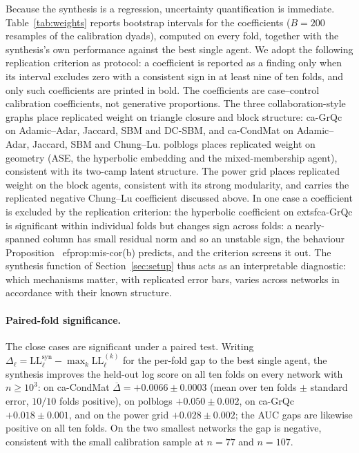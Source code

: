 \documentclass[12pt]{article}
\newcommand{\1}{\mathbf{1}}
\begin{document}
Because the synthesis is a regression, uncertainty quantification is immediate.
Table~\ref{tab:weights} reports bootstrap intervals for the coefficients ($B=200$ resamples of the
calibration dyads), computed on every fold, together with the synthesis's own performance against
the best single agent. We adopt the following replication criterion as protocol: a coefficient is
reported as a finding only when its interval excludes zero with a consistent sign in at least nine
of ten folds, and only such coefficients are printed in bold. The coefficients are case--control calibration coefficients, not generative proportions. The three collaboration-style graphs place replicated weight on triangle closure and block structure: \textsf{ca-GrQc} on
Adamic--Adar, Jaccard, SBM and DC-SBM, and \textsf{ca-CondMat} on Adamic--Adar, Jaccard, SBM and
Chung--Lu. \textsf{polblogs} places replicated weight on geometry (ASE, the hyperbolic embedding and the
mixed-membership agent), consistent with its two-camp latent structure. The \textsf{power} grid
places replicated weight on the block agents, consistent with its strong modularity, and carries the replicated
negative Chung--Lu coefficient discussed above. In one case a coefficient is excluded by the replication criterion: the hyperbolic coefficient on 	extsf{ca-GrQc} is significant within individual folds but changes sign across folds: a nearly-spanned column has small residual norm and so an unstable sign, the behaviour Proposition~
ef{prop:mis-cor}(b) predicts, and the criterion screens it out.
The synthesis function of Section~\ref{sec:setup} thus acts as an interpretable diagnostic: which
mechanisms matter, with replicated error bars, varies across networks in accordance with their known
structure.

\paragraph{Paired-fold significance.}
The close cases are significant under a paired test. Writing $\Delta_\ell=\mathrm{LL}^{\mathrm{syn}}
_\ell-\max_k\mathrm{LL}^{(k)}_\ell$ for the per-fold gap to the best single agent, the synthesis
improves the held-out log score on all ten folds on every network with $n\ge10^3$: on
\textsf{ca-CondMat} $\overline\Delta=+0.0066\pm0.0003$ (mean over ten folds $\pm$ standard error,
$10/10$ folds positive), on \textsf{polblogs} $+0.050\pm0.002$, on \textsf{ca-GrQc}
$+0.018\pm0.001$, and on the power grid $+0.028\pm0.002$; the AUC gaps are likewise positive on all
ten folds. On the two smallest networks the gap is negative, consistent with the small calibration
sample at $n=77$ and $n=107$.
\end{document}
